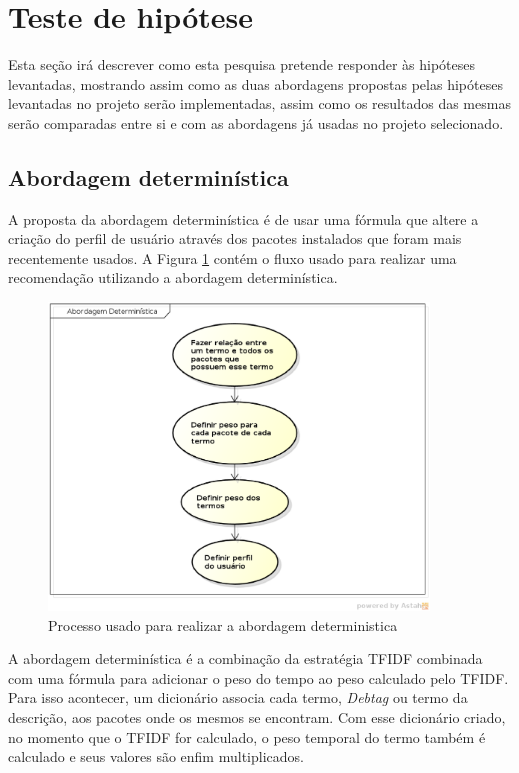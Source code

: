 \section{Teste de hipótese}

Esta seção irá descrever como esta pesquisa pretende responder às hipóteses
levantadas, mostrando assim como as duas abordagens propostas pelas hipóteses
levantadas no projeto serão implementadas, assim como os resultados das mesmas
serão comparadas entre si e com as abordagens já usadas no projeto selecionado.

\subsection{Abordagem determinística}

A proposta da abordagem determinística é de usar uma fórmula que altere
a criação do perfil de usuário através dos pacotes instalados que foram mais
recentemente usados. A Figura \ref{fig:abordagem_deterministica}
contém o fluxo usado para realizar uma
recomendação utilizando a abordagem determinística.

\begin{figure}[h]
  \centering
  \includegraphics[width=0.9\textwidth]{figuras/abordagem_deterministica.eps}
  \caption{Processo usado para realizar a abordagem deterministica}
  \label{fig:abordagem_deterministica}
\end{figure}

A abordagem determinística é a combinação da estratégia TFIDF combinada com
uma fórmula para adicionar o peso do tempo ao peso calculado pelo TFIDF. Para
isso acontecer, um dicionário associa cada termo, \textit{Debtag} ou termo da
descrição, aos pacotes onde os mesmos se encontram. Com esse dicionário criado,
no momento que o TFIDF for calculado, o peso temporal do termo também é
calculado e seus valores são enfim multiplicados.

